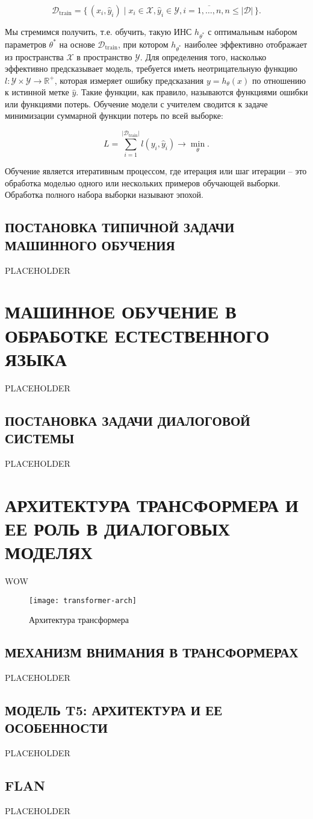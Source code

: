 $$\mathcal{D}_{\text{train}}=\{\,(x_i, \hat y_i) \mid x_i \in \mathcal{X}, \hat y_i \in \mathcal{Y}, i=\overline{1, \dots, n}, n \le \lvert \mathcal{D} \rvert\,\}.$$

Мы стремимся получить, т.е. обучить, такую ИНС $h_{\theta^*}$ с оптимальным набором параметров $\theta^*$ на основе $\mathcal{D}_{\text{train}}$, при котором $h_{\theta^*}$ наиболее эффективно отображает из пространства $\mathcal{X}$ в пространство $\mathcal{Y}$. Для определения того, насколько эффективно предсказывает модель, требуется иметь неотрицательную функцию $l: \mathcal{Y} \times \mathcal{Y} \rightarrow \mathbb{R}^+$, которая измеряет ошибку предсказания $y=h_{\theta}(x)$ по отношению к истинной метке $\hat y$. Такие функции, как правило, называются функциями ошибки или функциями потерь. Обучение модели с учителем сводится к задаче минимизации суммарной функции потерь по всей выборке:

$$L = \sum_{i=1}^{\lvert \mathcal{D}_{\text{train}} \rvert}l(y_i,\hat y_i) \rightarrow \min_{\theta}.$$

Обучение является итеративным процессом, где итерация или шаг итерации -- это обработка моделью одного или нескольких примеров обучающей выборки. Обработка полного набора выборки называют эпохой.

\subsection{ПОСТАНОВКА ТИПИЧНОЙ ЗАДАЧИ МАШИННОГО ОБУЧЕНИЯ}
PLACEHOLDER

\section{МАШИННОЕ ОБУЧЕНИЕ В ОБРАБОТКЕ ЕСТЕСТВЕННОГО ЯЗЫКА}
PLACEHOLDER

\subsection{ПОСТАНОВКА ЗАДАЧИ ДИАЛОГОВОЙ СИСТЕМЫ}
PLACEHOLDER

\section{АРХИТЕКТУРА ТРАНСФОРМЕРА И ЕЕ РОЛЬ В ДИАЛОГОВЫХ МОДЕЛЯХ}
WOW

\begin{figure}[H]
    \centering
    \texttt{[image: transformer-arch]}
    \caption{Архитектура трансформера}
    \label{fig:transformer-arch}
\end{figure}


\subsection{МЕХАНИЗМ ВНИМАНИЯ В ТРАНСФОРМЕРАХ}
PLACEHOLDER

\subsection{МОДЕЛЬ T5: АРХИТЕКТУРА И ЕЕ ОСОБЕННОСТИ}
PLACEHOLDER

\subsection{FLAN}
PLACEHOLDER
